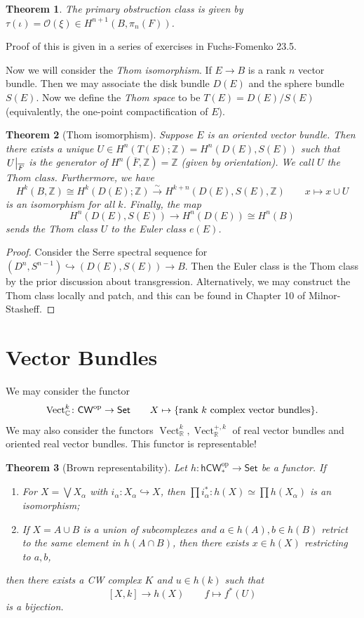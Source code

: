 \documentclass[leqno, openany]{memoir}
\newtheorem{thm}{Theorem}[section]
\theoremstyle{definition}
\theoremstyle{remark}
\theoremstyle{plain}
\theoremstyle{definition}
\theoremstyle{remark}
\newcommand{\R}{\mathbb{R}}
\newcommand{\C}{\mathbb{C}}
\newcommand{\Z}{\mathbb{Z}}
\newcommand{\mc}[1]{\mathcal{#1}}
\newcommand{\mr}[1]{\mathrm{#1}}
\newcommand{\ms}[1]{\mathsf{#1}}
\newcommand{\ol}[1]{\overline{#1}}
\DeclareMathOperator{\Vect}{Vect}
\begin{document}
\begin{thm}
    The primary obstruction class is given by $\tau(\iota) = \mc{O}(\xi) \in H^{n+1}(B, \pi_n(F))$.
\end{thm}
Proof of this is given in a series of exercises in Fuchs-Fomenko 23.5.

Now we will consider the \textit{Thom isomorphism}. If $E \to B$ is a rank $n$ vector bundle. Then we may associate the disk bundle $D(E)$ and the sphere bundle $S(E)$. Now we define the \textit{Thom space} to be $T(E) = D(E) / S(E)$ (equivalently, the one-point compactification of $E$).

\begin{thm}[Thom isomorphism]
    Suppose $E$ is an oriented vector bundle. Then there exists a unique $U \in H^n(T(E); \Z) = H^n(D(E), S(E))$ such that $\eval{U}_{\ol{F}}$ is the generator of $H^n(\ol{F}, \Z) = \Z$ (given by orientation). We call $U$ the \textit{Thom class}. Furthermore, we have
    \[ H^k(B, \Z) \cong H^k(D(E); \Z) \xrightarrow{\sim} H^{k+n}(D(E), S(E), \Z) \qquad x \mapsto x \cup U \]
    is an isomorphism for all $k$. Finally, the map 
    \[ H^n(D(E), S(E)) \to H^n(D(E)) \cong H^n(B) \]
    sends the Thom class $U$ to the Euler class $e(E)$.
\end{thm}

\begin{proof}
    Consider the Serre spectral sequence for $(D^n, S^{n-1}) \hookrightarrow (D(E), S(E)) \to B$. Then the Euler class is the Thom class by the prior discussion about transgression. Alternatively, we may construct the Thom class locally and patch, and this can be found in Chapter 10 of Milnor-Stasheff.
\end{proof}

\section{Vector Bundles}%
\label{sec:vector_bundles}

We may consider the functor
\[ \mr{Vect}_{\C}^k \colon \ms{CW}^{\mr{op}} \to \ms{Set} \qquad X \mapsto \qty{\text{rank $k$ complex vector bundles}}. \]
We may also consider the functors $\Vect_{\R}^k, \Vect_{\R}^{+, k}$ of real vector bundles and oriented real vector bundles. This functor is representable!

\begin{thm}[Brown representability]
    Let $h \colon \ms{hCW}_*^{\mr{op}} \to \ms{Set}$ be a functor. If
    \begin{enumerate}
        \item For $X = \bigvee X_{\alpha}$ with $i_{\alpha} \colon X_{\alpha} \hookrightarrow X$, then $\prod i_{\alpha}^* \colon h(X) \simeq \prod h(X_{\alpha})$ is an isomorphism;
        \item If $X = A \cup B$ is a union of subcomplexes and $a \in h(A), b \in h(B)$ retrict to the same element in $h(A \cap B)$, then there exists $x \in h(X)$ restricting to $a,b$,
    \end{enumerate}
    then there exists a CW complex $K$ and $u \in h(k)$ such that 
    \[ [X,k] \to h(X) \qquad f \mapsto f^*(U) \]
    is a bijection.
\end{thm}
\end{document}
